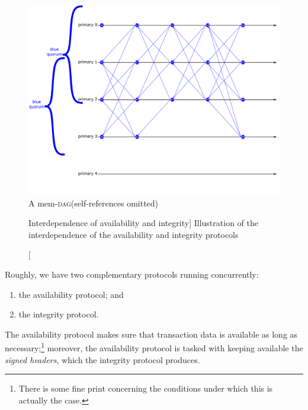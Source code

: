 \documentclass{article}
\theoremstyle{definition}
\newcommand{\Dag}[1][]{\textsc{dag}#1\xspace}
\begin{document}
\begin{figure}[htb]
  \centering
  \includegraphics[width=.95\linewidth]{./blue_dag.png}
  \caption{A mem-\Dag (self-references omitted)}
  \label{fig:blue_dag}
\end{figure}


\begin{figure}[htb]
  \centering
  
  \protect{}
  \caption%
  [Interdependence of availability and integrity]%
  {Illustration of 
    the interdependence of the availability and 
    integrity protocols}
  \label{fig:availability-n-integrity}
\end{figure}



Roughly, we have two complementary protocols running concurrently: 
 \begin{enumerate}
 \item the availability protocol; and
 \item the integrity protocol. 
 \end{enumerate}
 The availability protocol makes sure
 that transaction data is available 
 as long as necessary;\footnote{%
   There is some fine print concerning 
   the conditions under which this is actually the case. 
 }
 moreover,
 the availability protocol 
 is tasked with keeping available 
 the \emph{signed headers},
 which the integrity protocol produces. 
\end{document}
